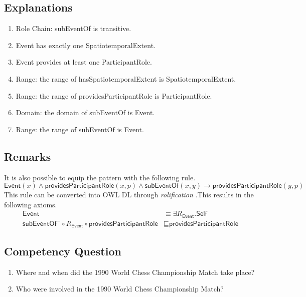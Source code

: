\subsection{Explanations}
\label{exp:Event}
\begin{enumerate}
\item Role Chain: \textsf{subEventOf} is transitive.
\item \textsf{Event} has exactly one \textsf{SpatiotemporalExtent}. 
\item \textsf{Event} provides at least one \textsf{ParticipantRole}.
\item Range: the range of \textsf{hasSpatiotemporalExtent} is \textsf{SpatiotemporalExtent}.
\item Range: the range of \textsf{providesParticipantRole} is \textsf{ParticipantRole}.
\item Domain: the domain of \textsf{subEventOf} is \textsf{Event}.
\item Range: the range of \textsf{subEventOf} is \textsf{Event}.
\end{enumerate}

\subsection{Remarks}
\label{rem:Event}
It is also possible to equip the pattern with the following rule.
\begin{equation}
\textsf{Event}(x) \wedge \textsf{providesParticipantRole}(x,p) \wedge \textsf{subEventOf}(x,y) \rightarrow \textsf{providesParticipantRole}(y,p)
\end{equation}
This rule can be converted into OWL DL through \emph{rolification} \cite{KrisnadhiMH11}.This results in the following axioms.
\begin{align}
\textsf{Event} &\equiv \exists R_\textsf{Event}.\textsf{Self} \\
\textsf{subEventOf}^- \circ R_\textsf{Event} \circ \textsf{providesParticipantRole} &\sqsubseteq \textsf{providesParticipantRole}
\end{align} 
\subsection{Competency Question}
\label{cqs:Event}
\begin{enumerate}[CQ1.]
\item Where and when did the 1990 World Chess Championship Match take place?
\item Who were involved in the 1990 World Chess Championship Match?
\end{enumerate}
\newpage

